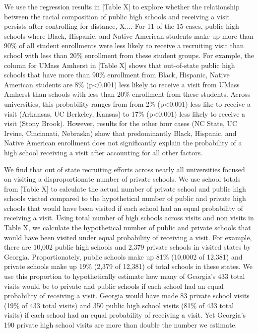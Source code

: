 \documentclass[twoside]{article}
\begin{document}
We use the regression results in [Table X] to explore whether the relationship between the racial composition of public high schools and receiving a visit persists after controlling for distance, X.... For 11 of the 15 cases,  public high schools where Black, Hispanic, and Native American students make up more than 90\% of all student enrollments were less likely to receive a recruiting visit than school with less than 20\% enrollment from these student groups. For example, the column for UMass Amherst in [Table X] shows that out-of-state public high schools that have more than 90\% enrollment from Black, Hispanic, Native American students are 8\% (p<0.001) less likely to receive a visit from UMass Amherst than schools with less than 20\% enrollment from these students.  Across universities, this probability ranges from from 2\% (p<0.001) less like to receive a visit (Arkansas, UC Berkeley, Kansas)  to 17\% (p<0.001) less likely to receive a visit (Stony Brook). However, results for the other four cases (NC State, UC Irvine, Cincinnati, Nebraska) show that predominantly Black, Hispanic, and Native American enrollment does not significantly explain the probability of a high school receiving a visit after accounting for all other factors. 

We find that out of state recruiting efforts across nearly all universities focused on visiting a disproportionate number of private schools. We use school totals from [Table X] to calculate the actual number of private school and public high schools visited compared to the hypothetical number of public and private high schools that would have been visited if each school had an equal probability of receiving a visit. Using total number of high schools across visits and non visits in Table X, we calculate the hypothetical number of public and private schools that would have been visited under equal probability of receiving a visit. For example, there are 10,002 public high schools and 2,379 private schools in visited states by Georgia. Proportionately, public schools  make up 81\%  (10,0002 of 12,381) and private schools make up 19\% (2,379 of 12,381) of total schools in these states. We use this proportion to hypothetically estimate how many of Georgia's 433 total visits would be to private and public schools if each school had an equal probability of receiving a visit. Georgia would have made 83 private school visits (19\% of 433 total visits) and 350 public high school visits (81\% of 433 total visits) if each school had an equal probability of receiving a visit. Yet Georgia’s 190 private high school visits are more than double the number we estimate. 
\end{document}

